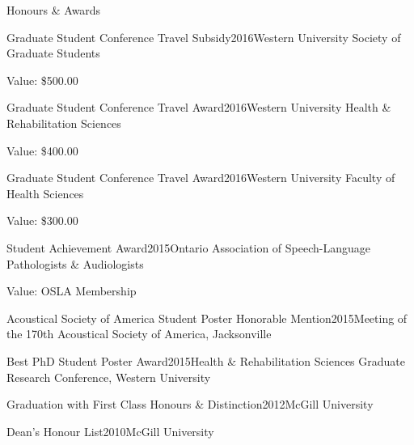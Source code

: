 \documentclass{resume} %
\begin{document}
\begin{rSection}{Honours \& Awards}
\begin{rSubsection}{Graduate Student Conference Travel Subsidy}{2016}{Western University Society of Graduate Students}{}
\item Value: \$500.00
\end{rSubsection}

\begin{rSubsection}{Graduate Student Conference Travel Award}{2016}{Western University Health \& Rehabilitation Sciences}{}
\item Value: \$400.00
\end{rSubsection}

\begin{rSubsection}{Graduate Student Conference Travel Award}{2016}{Western University Faculty of Health Sciences}{}
\item Value: \$300.00
\end{rSubsection}

\begin{rSubsection}{Student Achievement Award}{2015}{Ontario Association of Speech-Language Pathologists \&
Audiologists}{}
\item Value: OSLA Membership
\end{rSubsection}

\begin{rSubsection}{Acoustical Society of America Student Poster Honorable Mention}{2015}{Meeting of the 170th Acoustical Society of America, Jacksonville}{}
\end{rSubsection}

\begin{rSubsection}{Best PhD Student Poster Award}{2015}{Health \& Rehabilitation Sciences Graduate Research Conference, Western University}{}
\end{rSubsection}


\begin{rSubsection}{Graduation with First Class Honours \& Distinction}{2012}{McGill University}{ }
\end{rSubsection}

\begin{rSubsection}{Dean's Honour List}{2010}{McGill University}{}
\end{rSubsection}


\end{rSection}
\end{document}
